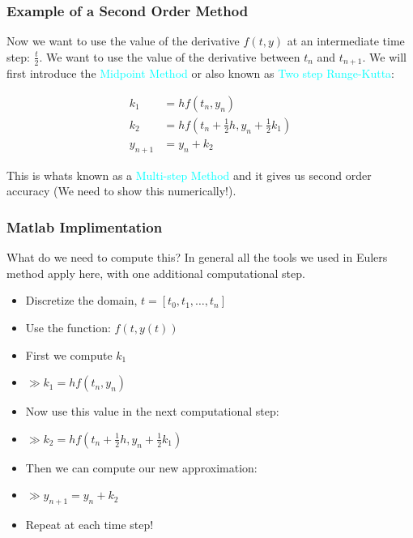 \documentclass{beamer}
\begin{document}
\begin{frame}
\frametitle{Example of a Second Order Method}

Now we want to use the value of the derivative $f(t,y)$ at an intermediate time step: $\frac{t}{2}$. We want to use the value of the derivative between $t_n$ and $t_{n+1}$. We will first introduce the \textcolor{cyan}{Midpoint Method} or also known as \textcolor{cyan}{Two step Runge-Kutta}: 

\begin{align*}
k_1 &= hf(t_n,y_n)\\
k_2 &= hf(t_n + \frac{1}{2}h, y_n + \frac{1}{2}k_1)\\
y_{n+1} &= y_n + k_2
\end{align*}

This is whats known as a \textcolor{cyan}{Multi-step Method} and it gives us second order accuracy (We need to show this numerically!). 

\end{frame}
\begin{frame}
\frametitle{Matlab Implimentation}

What do we need to compute this? In general all the tools we used in Eulers method apply here, with one additional computational step. 

\begin{itemize}
\item Discretize the domain, $t = [t_0,t_1,\hdots,t_n]$
\item Use the function: $f(t,y(t))$ 
\item First we compute $k_1$ 
\item $\gg k_1 =  hf(t_n,y_n)$
\item Now use this value in the next computational step: 
\item $\gg k_2 = hf(t_n + \frac{1}{2}h, y_n + \frac{1}{2}k_1)$
\item Then we can compute our  new approximation: 
\item $\gg y_{n+1} = y_n + k_2$
\item Repeat at each time step! 
\end{itemize}


\end{frame}
\end{document}
